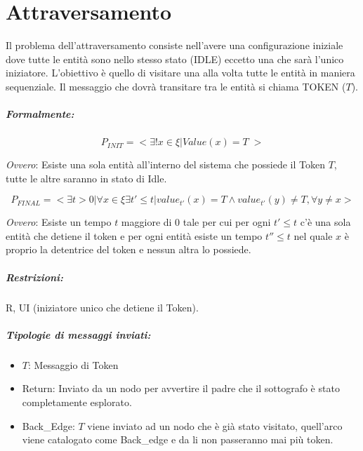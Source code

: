 \chapter{Attraversamento}

Il problema dell'attraversamento consiste nell'avere una
configurazione iniziale dove tutte le entità sono nello stesso stato (IDLE)
eccetto una che sarà l'unico iniziatore. L'obiettivo è quello di visitare una
alla volta tutte le entità in maniera sequenziale. Il messaggio che dovrà
transitare tra le entità si chiama TOKEN ($T$).

\paragraph{Formalmente:}

$$
    P_{INIT} = <\exists ! x \in \xi | Value(x) = T \;>
$$

\textit{Ovvero}: Esiste una sola entità all'interno del sistema che possiede il
Token $T$, tutte le altre saranno in stato di Idle.

$$
    P_{FINAL} = <\exists t>0 | \forall x \in \xi \exists t' \leq t | value_{t'}(x)
    = T  \wedge value_{t'}(y) \neq T, \forall y \neq x >
$$

\textit{Ovvero}: Esiste un tempo $t$ maggiore di 0 tale per cui per ogni $t' \leq
    t$ c'è una sola entità che detiene il token e per ogni entità esiste un tempo
$t'' \leq t$ nel quale $x$ è proprio la detentrice del token e nessun altra lo
possiede.

\paragraph{Restrizioni:} R, UI (iniziatore unico che detiene il Token).

\paragraph{Tipologie di messaggi inviati:}
\begin{itemize}
    \item $T$: Messaggio di Token
    \item Return: Inviato da un nodo per avvertire il padre che il sottografo è
          stato completamente esplorato.
    \item Back\_Edge: $T$ viene inviato ad un nodo che è già stato visitato,
          quell'arco viene catalogato come Back\_edge e da li non passeranno mai più
          token.
\end{itemize}

